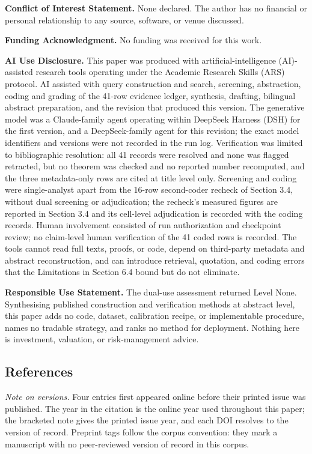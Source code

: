 \documentclass[11pt]{article}
\begin{document}
\textbf{Conflict of Interest Statement.} None declared. The author has no financial or personal relationship to any source, software, or venue discussed.

\textbf{Funding Acknowledgment.} No funding was received for this work.

\textbf{AI Use Disclosure.} This paper was produced with artificial-intelligence (AI)-assisted research tools operating under the Academic Research Skills (ARS) protocol. AI assisted with query construction and search, screening, abstraction, coding and grading of the 41-row evidence ledger, synthesis, drafting, bilingual abstract preparation, and the revision that produced this version. The generative model was a Claude-family agent operating within DeepSeek Harness (DSH) for the first version, and a DeepSeek-family agent for this revision; the exact model identifiers and versions were not recorded in the run log. Verification was limited to bibliographic resolution: all 41 records were resolved and none was flagged retracted, but no theorem was checked and no reported number recomputed, and the three metadata-only rows are cited at title level only. Screening and coding were single-analyst apart from the 16-row second-coder recheck of Section 3.4, without dual screening or adjudication; the recheck's measured figures are reported in Section 3.4 and its cell-level adjudication is recorded with the coding records. Human involvement consisted of run authorization and checkpoint review; no claim-level human verification of the 41 coded rows is recorded. The tools cannot read full texts, proofs, or code, depend on third-party metadata and abstract reconstruction, and can introduce retrieval, quotation, and coding errors that the Limitations in Section 6.4 bound but do not eliminate.

\textbf{Responsible Use Statement.} The dual-use assessment returned Level None. Synthesising published construction and verification methods at abstract level, this paper adds no code, dataset, calibration recipe, or implementable procedure, names no tradable strategy, and ranks no method for deployment. Nothing here is investment, valuation, or risk-management advice.

\subsection*{References}
\textit{Note on versions.} Four entries first appeared online before their printed issue was published. The year in the citation is the online year used throughout this paper; the bracketed note gives the printed issue year, and each DOI resolves to the version of record. Preprint tags follow the corpus convention: they mark a manuscript with no peer-reviewed version of record in this corpus.
\end{document}
